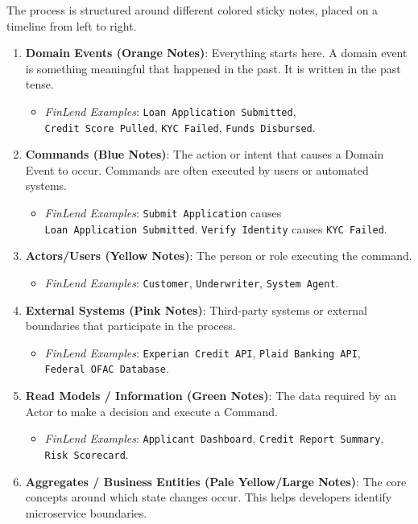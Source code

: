 \documentclass[
  11pt,
  openany,
  oneside]{book}
\providecommand{\tightlist}{%
  \setlength{\itemsep}{0pt}\setlength{\parskip}{0pt}}
\begin{document}
The process is structured around different colored sticky notes, placed
on a timeline from left to right.

\begin{enumerate}
\def\labelenumi{\arabic{enumi}.}
\tightlist
\item
  \textbf{Domain Events (Orange Notes)}: Everything starts here. A
  domain event is something meaningful that happened in the past. It is
  written in the past tense.

  \begin{itemize}
  \tightlist
  \item
    \emph{FinLend Examples}: \texttt{Loan\ Application\ Submitted},
    \texttt{Credit\ Score\ Pulled}, \texttt{KYC\ Failed},
    \texttt{Funds\ Disbursed}.
  \end{itemize}
\item
  \textbf{Commands (Blue Notes)}: The action or intent that causes a
  Domain Event to occur. Commands are often executed by users or
  automated systems.

  \begin{itemize}
  \tightlist
  \item
    \emph{FinLend Examples}: \texttt{Submit\ Application} causes
    \texttt{Loan\ Application\ Submitted}. \texttt{Verify\ Identity}
    causes \texttt{KYC\ Failed}.
  \end{itemize}
\item
  \textbf{Actors/Users (Yellow Notes)}: The person or role executing the
  command.

  \begin{itemize}
  \tightlist
  \item
    \emph{FinLend Examples}: \texttt{Customer}, \texttt{Underwriter},
    \texttt{System\ Agent}.
  \end{itemize}
\item
  \textbf{External Systems (Pink Notes)}: Third-party systems or
  external boundaries that participate in the process.

  \begin{itemize}
  \tightlist
  \item
    \emph{FinLend Examples}: \texttt{Experian\ Credit\ API},
    \texttt{Plaid\ Banking\ API}, \texttt{Federal\ OFAC\ Database}.
  \end{itemize}
\item
  \textbf{Read Models / Information (Green Notes)}: The data required by
  an Actor to make a decision and execute a Command.

  \begin{itemize}
  \tightlist
  \item
    \emph{FinLend Examples}: \texttt{Applicant\ Dashboard},
    \texttt{Credit\ Report\ Summary}, \texttt{Risk\ Scorecard}.
  \end{itemize}
\item
  \textbf{Aggregates / Business Entities (Pale Yellow/Large Notes)}: The
  core concepts around which state changes occur. This helps developers
  identify microservice boundaries.


\end{enumerate}
\end{document}
